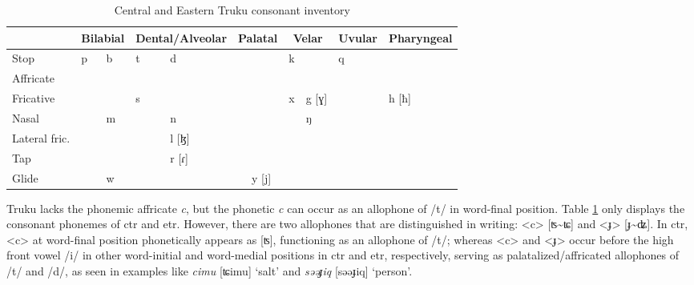 \begin{table}[!htbp]
\centering
\caption{Central and Eastern Truku consonant inventory}
\label{tab:trC}
\begin{tabular}{l|ll|ll|ll|ll|ll|ll}
\hline
                    & \multicolumn{2}{c|}{Bilabial} & \multicolumn{2}{c|}{Dental/Alveolar} & \multicolumn{2}{c|}{Palatal} & \multicolumn{2}{c|}{Velar} & \multicolumn{2}{c|}{Uvular} & \multicolumn{2}{c}{Pharyngeal} \\ \hline
Stop                & p            & b           & t \quad\quad\quad              & d               &             &               & k          &            & q            &            &                 &              \\
Affricate           &               &              &                &                  &             &               &             &             &               &            &                 &              \\
Fricative           &               &              & s               &                  &             &               & x          &   g [ɣ]          &               &            & h [ħ]             &              \\
Nasal               &               & m           &                  & n               &             &               &             & ŋ          &               &            &                 &              \\
Lateral fric. &               &              &                  & l [ɮ]              &             &               &             &             &               &            &                 &              \\
Tap                 &               &              &                  & r [ɾ]              &             &               &             &             &               &            &                 &              \\
Glide               &               & w           &                  &                  &             & y [j]           &             &             &               &            &                 &              \\ \hline
\end{tabular}
\end{table}

Truku lacks the phonemic affricate \textit{c}, but the phonetic \textit{c} can occur as an allophone of /t/ in word-final position. Table \ref{tab:trC} only displays the consonant phonemes of \acl{ctr} and \acl{etr}. However, there are two allophones that are distinguished in writing: <c> [ʦ\~{ }ʨ] and <ɟ> [ɟ\~{ }ʥ]. In \acl{ctr}, <c> at word-final position phonetically appears as [ʦ], functioning as an allophone of /t/; whereas <c> and <ɟ> occur before the high front vowel /i/ in other word-initial and word-medial positions in \acl{ctr} and \acl{etr}, respectively, serving as palatalized/affricated allophones of /t/ and /d/, as seen in examples like \textit{cimu} [ʨimu] `salt' and \textit{səəɟiq} [səəɟiq] `person'.

